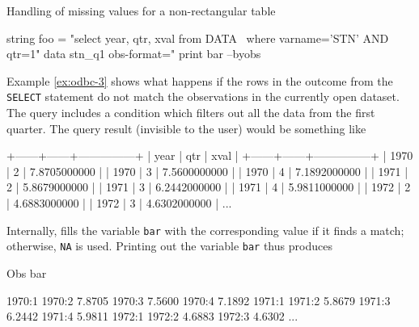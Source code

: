 \begin{script}[htbp]
  \caption{Handling of missing values for a non-rectangular table}
  \label{ex:odbc-3}
\begin{scode}
string foo = "select year, qtr, xval from DATA \
       where varname='STN' AND qtr=1"
data stn_q1 obs-format="%
print bar --byobs
\end{scode}

Example \ref{ex:odbc-3} shows what happens if the rows in
the outcome from the \texttt{SELECT} statement do not match the
observations in the currently open  dataset. The query
includes a condition which filters out all the data from the first
quarter. The query result (invisible to the user) would be something
like
\begin{code}
+------+------+---------------+
| year | qtr  | xval          |
+------+------+---------------+
| 1970 |    2 |  7.8705000000 | 
| 1970 |    3 |  7.5600000000 | 
| 1970 |    4 |  7.1892000000 | 
| 1971 |    2 |  5.8679000000 | 
| 1971 |    3 |  6.2442000000 | 
| 1971 |    4 |  5.9811000000 | 
| 1972 |    2 |  4.6883000000 | 
| 1972 |    3 |  4.6302000000 | 
...
\end{code}
Internally,  fills the variable \texttt{bar} with the
corresponding value if it finds a match; otherwise, \texttt{NA} is
used. Printing out the variable \texttt{bar} thus produces
\begin{code}
     Obs           bar

  1970:1              
  1970:2        7.8705
  1970:3        7.5600
  1970:4        7.1892
  1971:1              
  1971:2        5.8679
  1971:3        6.2442
  1971:4        5.9811
  1972:1              
  1972:2        4.6883
  1972:3        4.6302
...
\end{code}

\end{script}
